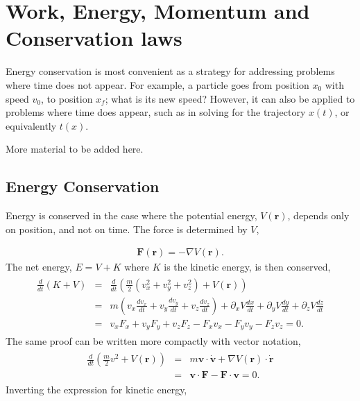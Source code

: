 \documentclass[letterpaper,10pt,english]{sphinxmanual}
\begin{document}
\chapter{Work, Energy, Momentum and Conservation laws}
\label{\detokenize{chapter1:work-energy-momentum-and-conservation-laws}}
Energy conservation is most convenient as a strategy for addressing
problems where time does not appear. For example, a particle goes
from position \(x_0\) with speed \(v_0\), to position \(x_f\); what is its
new speed? However, it can also be applied to problems where time
does appear, such as in solving for the trajectory \(x(t)\), or
equivalently \(t(x)\).

More material to be added here.


\section{Energy Conservation}
\label{\detokenize{chapter1:energy-conservation}}
Energy is conserved in the case where the potential energy, \(V(\boldsymbol{r})\), depends only on position, and not on time. The force is determined by \(V\),




\begin{equation*}
\begin{split}
\begin{equation}
\boldsymbol{F}(\boldsymbol{r})=-\nabla V(\boldsymbol{r}).
\label{_auto22} \tag{25}
\end{equation}
\end{split}
\end{equation*}
The net energy, \(E=V+K\) where \(K\) is the kinetic energy, is then conserved,
\begin{equation*}
\begin{split}
\begin{eqnarray}
\frac{d}{dt}(K+V)&=&\frac{d}{dt}\left(\frac{m}{2}(v_x^2+v_y^2+v_z^2)+V(\boldsymbol{r})\right)\\
\nonumber
&=&m\left(v_x\frac{dv_x}{dt}+v_y\frac{dv_y}{dt}+v_z\frac{dv_z}{dt}\right)
+\partial_xV\frac{dx}{dt}+\partial_yV\frac{dy}{dt}+\partial_zV\frac{dz}{dt}\\
\nonumber
&=&v_xF_x+v_yF_y+v_zF_z-F_xv_x-F_yv_y-F_zv_z=0.
\end{eqnarray}
\end{split}
\end{equation*}
The same proof can be written more compactly with vector notation,
\begin{equation*}
\begin{split}
\begin{eqnarray}
\frac{d}{dt}\left(\frac{m}{2}v^2+V(\boldsymbol{r})\right)
&=&m\boldsymbol{v}\cdot\dot{\boldsymbol{v}}+\nabla V(\boldsymbol{r})\cdot\dot{\boldsymbol{r}}\\
\nonumber
&=&\boldsymbol{v}\cdot\boldsymbol{F}-\boldsymbol{F}\cdot\boldsymbol{v}=0.
\end{eqnarray}
\end{split}
\end{equation*}
Inverting the expression for kinetic energy,
\end{document}
